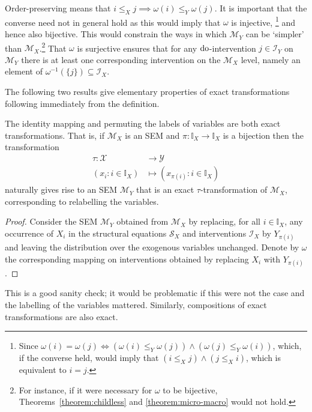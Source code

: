 Order-preserving means that ${i \leq_X j \implies \omega(i) \leq_Y \omega(j)}$.
It is important that the converse need not in general hold as this would imply that $\omega$ is injective,%
\footnote{Since ${\omega(i)=\omega(j) \iff \left(\omega(i) \leq_Y \omega(j)\right) \land \left(\omega(j) \leq_Y \omega(i)\right)}$, which, if the converse held, would imply that $\left(i \leq_X j\right) \land \left(j \leq_X i\right)$, which is equivalent to $i=j$.}
and hence also bijective.
This would constrain the ways in which $\mathcal{M}_Y$ can be `simpler' than $\mathcal{M}_X$.\footnote{For instance, if it were necessary for $\omega$ to be bijective, Theorems~\ref{theorem:childless} and \ref{theorem:micro-macro} would not hold.}
That $\omega$ is surjective ensures that for any $\operatorname{do}$-intervention $j \in \mathcal{I}_Y$ on $\mathcal{M}_Y$ there is at least one corresponding intervention on the $\mathcal{M}_X$ level, namely an element of $\omega^{-1}(\{j\}) \subseteq \mathcal{I}_X$.

The following two results give elementary properties of exact transformations following immediately from the definition.
\medskip

\begin{lemma}\label{lemma:elementary}
The identity mapping and permuting the labels of variables are both exact transformations.
That is, if $\mathcal{M}_X$ is an SEM and $\pi:\mathbb{I}_X \to \mathbb{I}_X$ is a bijection then the transformation
\begin{align*}
\tau:\mathcal{X}&\to\mathcal{Y}\\
(x_i:i\in\mathbb{I}_X) &\mapsto (x_{\pi(i)}:i\in\mathbb{I}_X)
\end{align*}
naturally gives rise to an SEM $\mathcal{M}_Y$ that is an exact $\tau$-transformation of $\mathcal{M}_X$, corresponding to relabelling the variables.
\end{lemma}

\begin{proof}
Consider the SEM $\mathcal{M}_Y$ obtained from $\mathcal{M}_X$ by replacing, for all $i\in\mathbb{I}_X$, any occurrence of $X_i$ in the structural equations $\mathcal{S}_X$ and interventions $\mathcal{I}_X$ by $Y_{\pi(i)}$ and leaving the distribution over the exogenous variables unchanged. Denote by $\omega$ the corresponding mapping on interventions obtained by replacing $X_i$ with $Y_{\pi(i)}$.
\end{proof}

This is a good sanity check; it would be problematic if this were not the case and the labelling of the variables mattered. Similarly, compositions of exact transformations are also exact.

